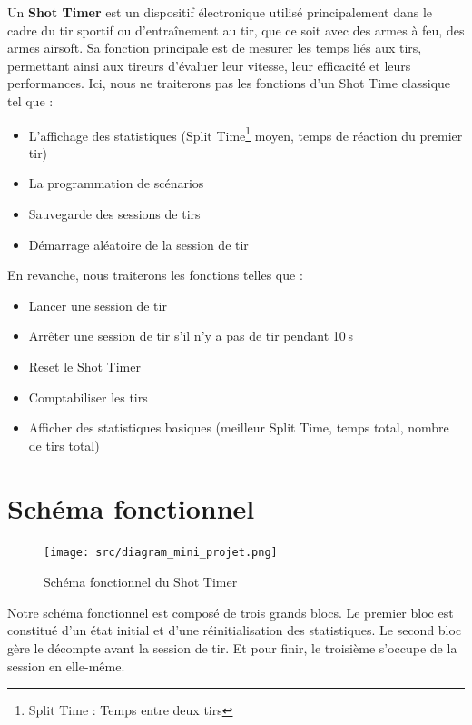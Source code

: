 \documentclass{rapport}
\begin{document}
Un \textbf{Shot Timer} est un dispositif électronique utilisé principalement dans le cadre du tir sportif ou d’entraînement au tir, que ce soit avec des armes à feu, des armes airsoft. Sa fonction principale est de mesurer les temps liés aux tirs, permettant ainsi aux tireurs d'évaluer leur vitesse, leur efficacité et leurs performances.
\newline
\newline
Ici, nous ne traiterons pas les fonctions d’un Shot Time classique tel que :
\begin{itemize}
    \item L’affichage des statistiques (Split Time\footnote{Split Time : Temps entre deux tirs}  moyen, temps de réaction du premier tir)
    \item La programmation de scénarios
    \item Sauvegarde des sessions de tirs
    \item Démarrage aléatoire de la session de tir
\end{itemize}
\newline
En revanche, nous traiterons les fonctions telles que :
\begin{itemize}
    \item Lancer une session de tir
    \item Arrêter une session de tir s'il n'y a pas de tir pendant 10 s 
    \item Reset le Shot Timer
    \item Comptabiliser les tirs
    \item Afficher des statistiques basiques (meilleur Split Time, temps total, nombre de tirs total)

\end{itemize}


\section{Schéma fonctionnel}

\begin{figure}[h!]

    \centering

    \texttt{[image: src/diagram\_mini\_projet.png]}

    \caption{Schéma fonctionnel du Shot Timer}

    \label{fig:functional_diagram}

\end{figure}

Notre schéma fonctionnel est composé de trois grands blocs. Le premier bloc est constitué d'un état initial et d'une réinitialisation des statistiques. Le second bloc gère le décompte avant la session de tir. Et pour finir, le troisième s'occupe de la session en elle-même.
\end{document}
